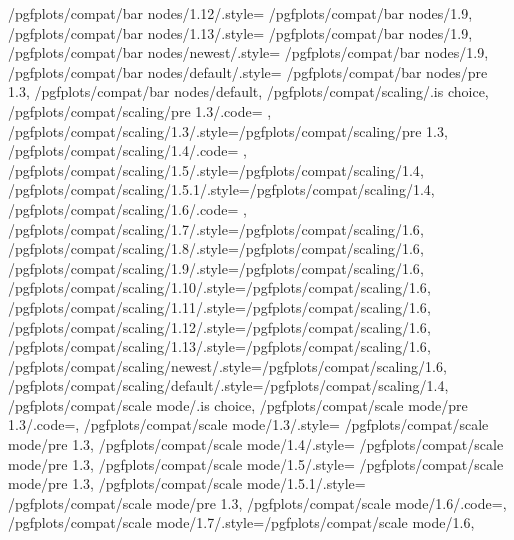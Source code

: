 {	/pgfplots/compat/bar nodes/1.12/.style=		{/pgfplots/compat/bar nodes/1.9},%
	/pgfplots/compat/bar nodes/1.13/.style=		{/pgfplots/compat/bar nodes/1.9},%
	/pgfplots/compat/bar nodes/newest/.style=	{/pgfplots/compat/bar nodes/1.9},%
	/pgfplots/compat/bar nodes/default/.style=	{/pgfplots/compat/bar nodes/pre 1.3},%
	/pgfplots/compat/bar nodes/default,
	/pgfplots/compat/scaling/.is choice,
	/pgfplots/compat/scaling/pre 1.3/.code={%
		\def\pgfplots@compat@scaling@zunitfix@enable{0}%
		\def\pgfplots@compat@scaling@coordmath{pgfbasic}%
		\def\pgfplots@compat@scaling@coordmath@final{pgfbasic}%
	},
	/pgfplots/compat/scaling/1.3/.style={/pgfplots/compat/scaling/pre 1.3},
	/pgfplots/compat/scaling/1.4/.code={%
		\def\pgfplots@compat@scaling@zunitfix@enable{1}%
		\def\pgfplots@compat@scaling@coordmath{float}%
		\def\pgfplots@compat@scaling@coordmath@final{pgfbasic}%
	},
	/pgfplots/compat/scaling/1.5/.style={/pgfplots/compat/scaling/1.4},
	/pgfplots/compat/scaling/1.5.1/.style={/pgfplots/compat/scaling/1.4},
	/pgfplots/compat/scaling/1.6/.code={%
		\def\pgfplots@compat@scaling@zunitfix@enable{1}%
		\def\pgfplots@compat@scaling@coordmath{float}%
		\def\pgfplots@compat@scaling@coordmath@final{float}%
	},
	/pgfplots/compat/scaling/1.7/.style={/pgfplots/compat/scaling/1.6},
	/pgfplots/compat/scaling/1.8/.style={/pgfplots/compat/scaling/1.6},
	/pgfplots/compat/scaling/1.9/.style={/pgfplots/compat/scaling/1.6},
	/pgfplots/compat/scaling/1.10/.style={/pgfplots/compat/scaling/1.6},
	/pgfplots/compat/scaling/1.11/.style={/pgfplots/compat/scaling/1.6},
	/pgfplots/compat/scaling/1.12/.style={/pgfplots/compat/scaling/1.6},
	/pgfplots/compat/scaling/1.13/.style={/pgfplots/compat/scaling/1.6},
	/pgfplots/compat/scaling/newest/.style={/pgfplots/compat/scaling/1.6},
	/pgfplots/compat/scaling/default/.style={/pgfplots/compat/scaling/1.4},
	/pgfplots/compat/scale mode/.is choice,
	/pgfplots/compat/scale mode/pre 1.3/.code=\def\pgfplots@compat@scale@mode@compatible@mode{1},%
	/pgfplots/compat/scale mode/1.3/.style=		{/pgfplots/compat/scale mode/pre 1.3},
	/pgfplots/compat/scale mode/1.4/.style=		{/pgfplots/compat/scale mode/pre 1.3},
	/pgfplots/compat/scale mode/1.5/.style=	 	{/pgfplots/compat/scale mode/pre 1.3},
	/pgfplots/compat/scale mode/1.5.1/.style=	{/pgfplots/compat/scale mode/pre 1.3},
	/pgfplots/compat/scale mode/1.6/.code=\def\pgfplots@compat@scale@mode@compatible@mode{0},
	/pgfplots/compat/scale mode/1.7/.style={/pgfplots/compat/scale mode/1.6},
}
